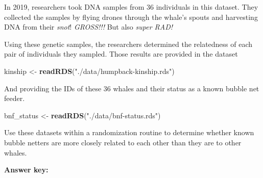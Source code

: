 \documentclass[]{book}
\newenvironment{Shaded}{\begin{snugshade}}{\end{snugshade}}
\newcommand{\KeywordTok}[1]{\textcolor[rgb]{0.13,0.29,0.53}{\textbf{#1}}}
\newcommand{\NormalTok}[1]{#1}
\newcommand{\StringTok}[1]{\textcolor[rgb]{0.31,0.60,0.02}{#1}}
\begin{document}
In 2019, researchers took DNA samples from 36 individuals in this dataset. They collected the samples by flying drones through the whale's spouts and harvesting DNA from their \emph{snot}! \emph{GROSS!!!} But also \emph{super RAD!}

Using these genetic samples, the researchers determined the relatedness of each pair of individuals they sampled. Those results are provided in the dataset

\begin{Shaded}
\begin{Highlighting}[]
\NormalTok{kinship <-}\StringTok{ }\KeywordTok{readRDS}\NormalTok{(}\StringTok{"./data/humpback-kinship.rds"}\NormalTok{)}
\end{Highlighting}
\end{Shaded}

And providing the IDs of these 36 whales and their status as a known bubble net feeder.

\begin{Shaded}
\begin{Highlighting}[]
\NormalTok{bnf_status <-}\StringTok{ }\KeywordTok{readRDS}\NormalTok{(}\StringTok{"./data/bnf-status.rds"}\NormalTok{)}
\end{Highlighting}
\end{Shaded}

Use these datasets within a randomization routine to determine whether known bubble netters are more closely related to each other than they are to other whales.

\textbf{Answer key:}
\end{document}
